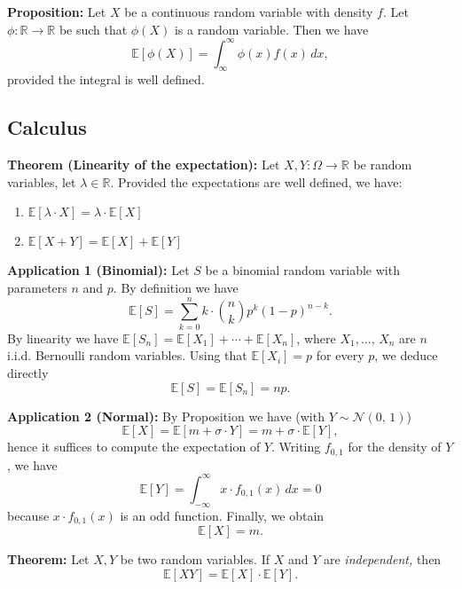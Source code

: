 \documentclass[a4paper]{extarticle}
\begin{document}
\begin{cbox}
    \textbf{Proposition:} Let \(X\) be a continuous random variable with density \(f\). Let \(\phi : \mathbb{R} \to \mathbb{R}\) be such that \(\phi(X)\) is a random variable. Then we have
    \[
        \mathbb{E}[\phi(X)] = \int_{\infty}^{\infty} \phi(x)f(x) \, dx,
    \]
    provided the integral is well defined.
\end{cbox}

\subsection{Calculus}

\begin{tbox}
    \textbf{Theorem (Linearity of the expectation):} Let \(X,Y : \Omega \to \mathbb{R}\) be random variables, let \(\lambda \in \mathbb{R}\). Provided the expectations are well defined, we have:
    \begin{enumerate}
        \item \(\mathbb{E}[\lambda \cdot X] = \lambda \cdot \mathbb{E}[X]\)
        \item \(\mathbb{E}[X + Y] = \mathbb{E}[X] + \mathbb{E}[Y]\)
    \end{enumerate}
\end{tbox}

\textbf{Application 1 (Binomial):} Let \(S\) be a binomial random variable with parameters \(n\) and \(p\). By definition we have
\[
    \mathbb{E}[S] = \sum_{k = 0}^n k \cdot \binom{n}{k} p^k (1 - p)^{n - k}.
\]
By linearity we have \(\mathbb{E}[S_n] = \mathbb{E}[X_1] + \cdots + \mathbb{E}[X_n]\), where \(X_1,..., \, X_n\) are \(n\) i.i.d. Bernoulli random variables. Using that \(\mathbb{E}[X_i] = p\) for every \(p\), we deduce directly
\[
    \mathbb{E}[S] = \mathbb{E}[S_n] = np.
\]

\textbf{Application 2 (Normal):} By Proposition we have (with \(Y \sim \mathcal{N}(0, \, 1)\))
\[
    \mathbb{E}[X] = \mathbb{E}[m + \sigma \cdot Y] = m + \sigma \cdot \mathbb{E}[Y],
\]
hence it suffices to compute the expectation of \(Y\). Writing \(f_{0,1}\) for the density of \(Y\), we have
\[
    \mathbb{E}[Y] = \int_{- \infty}^{\infty} x \cdot f_{0,1}(x) \, dx = 0
\]
because \(x \cdot f_{0,1}(x)\) is an odd function. Finally, we obtain
\[
    \mathbb{E}[X] = m.
\]

\begin{tbox}
    \textbf{Theorem:} Let \(X,Y\) be two random variables. If \(X\) and \(Y\) are \textit{independent,} then
    \[
        \mathbb{E}[XY] = \mathbb{E}[X] \cdot \mathbb{E}[Y].
    \]
\end{tbox}
\end{document}

